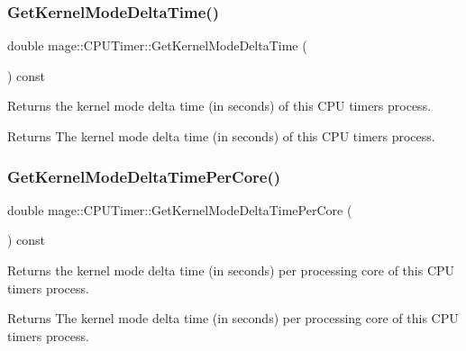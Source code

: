 \subsubsection{\texorpdfstring{Get\+Kernel\+Mode\+Delta\+Time()}{GetKernelModeDeltaTime()}}
{\footnotesize\ttfamily double mage\+::\+C\+P\+U\+Timer\+::\+Get\+Kernel\+Mode\+Delta\+Time (\begin{DoxyParamCaption}{ }\end{DoxyParamCaption}) const\hspace{0.3cm}{\ttfamily [noexcept]}}

Returns the kernel mode delta time (in seconds) of this C\+PU timer\textquotesingle{}s process.

\begin{DoxyReturn}{Returns}
The kernel mode delta time (in seconds) of this C\+PU timer\textquotesingle{}s process. 
\end{DoxyReturn}
\hypertarget{classmage_1_1_c_p_u_timer_afe75c00692363c1a942c50d84a348b56}{}\label{classmage_1_1_c_p_u_timer_afe75c00692363c1a942c50d84a348b56} 
\subsubsection{\texorpdfstring{Get\+Kernel\+Mode\+Delta\+Time\+Per\+Core()}{GetKernelModeDeltaTimePerCore()}}
{\footnotesize\ttfamily double mage\+::\+C\+P\+U\+Timer\+::\+Get\+Kernel\+Mode\+Delta\+Time\+Per\+Core (\begin{DoxyParamCaption}{ }\end{DoxyParamCaption}) const\hspace{0.3cm}{\ttfamily [noexcept]}}

Returns the kernel mode delta time (in seconds) per processing core of this C\+PU timer\textquotesingle{}s process.

\begin{DoxyReturn}{Returns}
The kernel mode delta time (in seconds) per processing core of this C\+PU timer\textquotesingle{}s process. 
\end{DoxyReturn}
\hypertarget{classmage_1_1_c_p_u_timer_a16e1bccdbc31f9345b52ffd9931fdcbd}{}\label{classmage_1_1_c_p_u_timer_a16e1bccdbc31f9345b52ffd9931fdcbd} 
